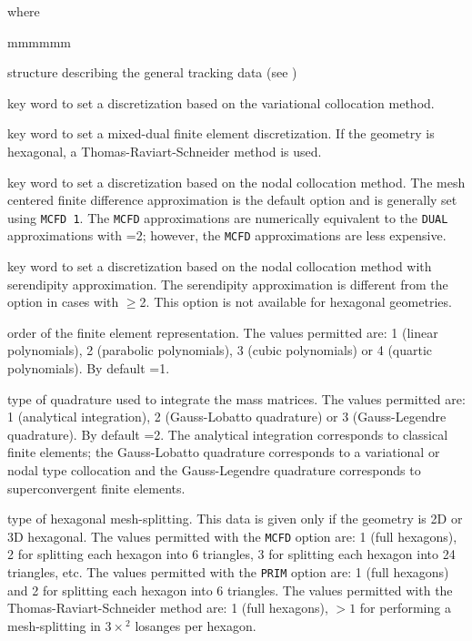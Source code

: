 \noindent where
\begin{ListeDeDescription}{mmmmmm}

\item[\dstr{desctrack}] structure describing the general tracking data (see
)

\item[\moc{PRIM}] key word to set a discretization based on the variational collocation method.

\item[\moc{DUAL}] key word to set a mixed-dual finite element discretization. If the
geometry is hexagonal, a Thomas-Raviart-Schneider method is used.

\item[\moc{MCFD}] key word to set a discretization based  on the nodal
collocation method. The mesh centered finite difference approximation is the
default option and is generally set using {\tt MCFD~1}. The {\tt MCFD}
approximations are numerically equivalent to the {\tt DUAL} approximations
with =2; however, the {\tt MCFD} approximations are less
expensive. 

\item[\moc{LUMP}] key word to set a discretization  based on the nodal
collocation method with serendipity approximation. The serendipity
approximation is different from the  option in cases with $\ge$2. This option is not available for hexagonal geometries.

\item[\dusa{ielem}] order of the finite element representation.  The values
permitted are: 1 (linear polynomials), 2 (parabolic polynomials), 3 (cubic
polynomials) or 4 (quartic polynomials). By default =1.

\item[\dusa{icol}] type of quadrature used to  integrate the mass matrices.
The values permitted are: 1 (analytical integration), 2  (Gauss-Lobatto
quadrature) or 3 (Gauss-Legendre quadrature). By default =2. The
analytical integration corresponds to classical finite elements; the
Gauss-Lobatto quadrature corresponds to a variational or nodal type
collocation and the Gauss-Legendre quadrature corresponds to superconvergent
finite elements.

\item[\dusa{isplh}] type of hexagonal mesh-splitting.  This data is given only
if the geometry is 2D or 3D hexagonal. The values permitted with the {\tt MCFD} option are: 1 (full
hexagons), 2 for splitting each hexagon into 6 triangles, 3 for splitting each
hexagon into 24 triangles, etc. The values permitted with the {\tt PRIM} option are: 1 (full
hexagons) and 2 for splitting each hexagon into 6 triangles. The values permitted with the Thomas-Raviart-Schneider method are:
1 (full hexagons), $>1$ for performing a mesh-splitting in $3 \times$$^2$
losanges per hexagon.


\end{ListeDeDescription}
